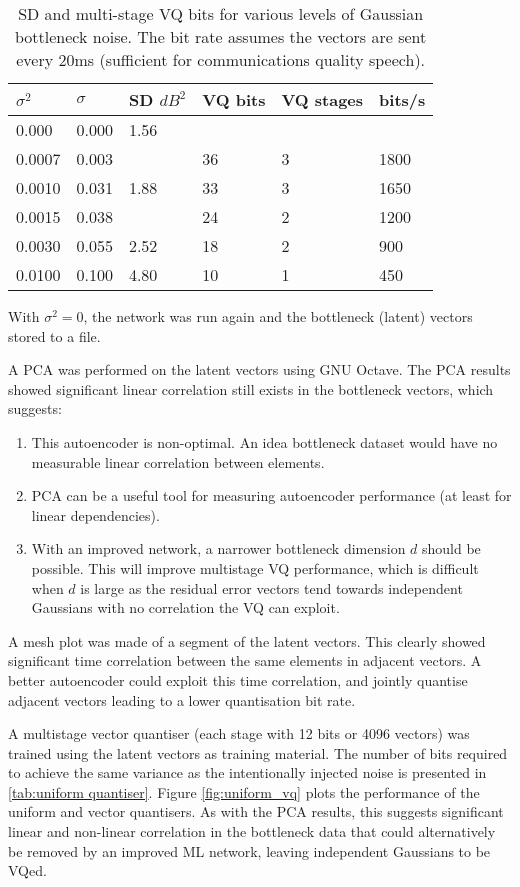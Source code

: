 \documentclass{article}
\begin{document}
\begin{table}
\label{tab:nn4_inference}
\centering
\begin{tabular}{l l l l l l}
\hline
$\sigma^2$ & $\sigma$ & SD $dB^2$ & VQ bits & VQ stages & bits/s \\
\hline
0.000  & 0.000 & 1.56 \\
0.0007 & 0.003 &      & 36 & 3 & 1800 \\
0.0010 & 0.031 & 1.88 & 33 & 3 & 1650 \\
0.0015 & 0.038 &      & 24 & 2 & 1200 \\
0.0030 & 0.055 & 2.52 & 18 & 2 & 900 \\
0.0100 & 0.100 & 4.80 & 10 & 1 & 450 \\
\hline
\end{tabular}
\caption{SD and multi-stage VQ bits for various levels of Gaussian bottleneck noise.  The bit rate assumes the vectors are sent every 20ms (sufficient for communications quality speech). }
\end{table}

With $\sigma^2=0$, the network was run again and the bottleneck (latent) vectors stored to a file.

A PCA was performed on the latent vectors using GNU Octave.  The PCA results showed significant linear correlation still exists in the bottleneck vectors, which suggests:
\begin{enumerate}
\item This autoencoder is non-optimal.  An idea bottleneck dataset would have no measurable linear correlation between elements.  
\item PCA can be a useful tool for measuring autoencoder performance (at least for linear dependencies).
\item With an improved network, a narrower bottleneck dimension $d$ should be possible.  This will improve multistage VQ performance, which is difficult when $d$ is large as the residual error vectors tend towards independent Gaussians with no correlation the VQ can exploit.
\end{enumerate}

A mesh plot was made of a segment of the latent vectors.  This clearly showed significant time correlation between the same elements in adjacent vectors.  A better autoencoder could exploit this time correlation, and jointly quantise adjacent vectors leading to a lower quantisation bit rate.

A multistage vector quantiser (each stage with 12 bits or 4096 vectors) was trained using the latent vectors as training material.  The number of bits required to achieve the same variance as the intentionally injected noise is presented in \ref{tab:uniform quantiser}.  Figure \ref{fig:uniform_vq} plots the performance of the uniform and vector quantisers.  As with the PCA results, this suggests significant linear and non-linear correlation in the bottleneck data that could alternatively be removed by an improved ML network, leaving independent Gaussians to be VQed.
\end{document}
